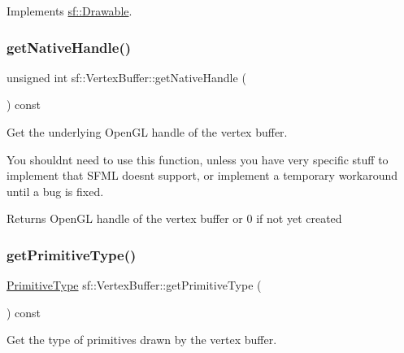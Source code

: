 Implements \mbox{\hyperlink{classsf_1_1_drawable_a90d2c88bba9b035a0844eccb380ef631}{sf\+::\+Drawable}}.

\mbox{\label{classsf_1_1_vertex_buffer_a343fa0a240c91bc4203a6727fcd9b920}} 
\subsubsection{\texorpdfstring{getNativeHandle()}{getNativeHandle()}}
{\footnotesize\ttfamily unsigned int sf\+::\+Vertex\+Buffer\+::get\+Native\+Handle (\begin{DoxyParamCaption}{ }\end{DoxyParamCaption}) const}



Get the underlying Open\+GL handle of the vertex buffer. 

You shouldn\textquotesingle{}t need to use this function, unless you have very specific stuff to implement that S\+F\+ML doesn\textquotesingle{}t support, or implement a temporary workaround until a bug is fixed.

\begin{DoxyReturn}{Returns}
Open\+GL handle of the vertex buffer or 0 if not yet created \begin{DoxyVerb}\end{DoxyVerb}
 
\end{DoxyReturn}
\mbox{\label{classsf_1_1_vertex_buffer_a02061d85472ff69e7ad14dc72f8fcaa4}} 
\subsubsection{\texorpdfstring{getPrimitiveType()}{getPrimitiveType()}}
{\footnotesize\ttfamily \mbox{\hyperlink{group__graphics_ga5ee56ac1339984909610713096283b1b}{Primitive\+Type}} sf\+::\+Vertex\+Buffer\+::get\+Primitive\+Type (\begin{DoxyParamCaption}{ }\end{DoxyParamCaption}) const}



Get the type of primitives drawn by the vertex buffer. 

